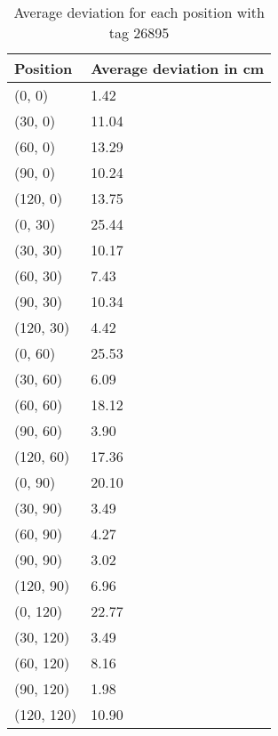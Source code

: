 \begin{table}[]
    \centering
    \begin{tabular}{|l|l|}
    \hline
    Position   & Average deviation in cm \\ \hline
    (0, 0)     & 1.42              \\ \hline
    (30, 0)    & 11.04             \\ \hline
    (60, 0)    & 13.29             \\ \hline
    (90, 0)    & 10.24             \\ \hline
    (120, 0)   & 13.75             \\ \hline
    (0, 30)    & 25.44             \\ \hline
    (30, 30)   & 10.17             \\ \hline
    (60, 30)   & 7.43              \\ \hline
    (90, 30)   & 10.34             \\ \hline
    (120, 30)  & 4.42              \\ \hline
    (0, 60)    & 25.53             \\ \hline
    (30, 60)   & 6.09              \\ \hline
    (60, 60)   & 18.12             \\ \hline
    (90, 60)   & 3.90              \\ \hline
    (120, 60)  & 17.36             \\ \hline
    (0, 90)    & 20.10             \\ \hline
    (30, 90)   & 3.49              \\ \hline
    (60, 90)   & 4.27              \\ \hline
    (90, 90)   & 3.02              \\ \hline
    (120, 90)  & 6.96              \\ \hline
    (0, 120)   & 22.77             \\ \hline
    (30, 120)  & 3.49              \\ \hline
    (60, 120)  & 8.16              \\ \hline
    (90, 120)  & 1.98              \\ \hline
    (120, 120) & 10.90             \\ \hline
    \end{tabular}
    \label{average-deviation-1-tag}
    \caption{Average deviation for each position with tag 26895}
\end{table}

